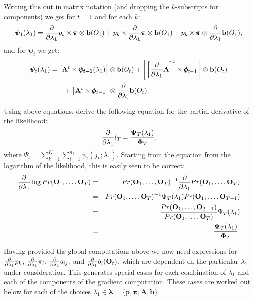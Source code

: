 \documentclass[a4paper,12pt,doc]{apaIngmar} %
\newcommand{\mat}{\mathbf}
\newcommand{\vc}{\mathbf}
\begin{document}
Writing this out in matrix notation (and dropping the $k$-subscripts 
for components) we get for $t=1$ and for each $k$:
\begin{eqnarray}
	\pmb{\psi}_{1}(\lambda_{1}) = \vc{\fpp} p_{k} \times \pmb{\pi} 
	\otimes \vc{b}(O_{1})+ p_{k} \times \vc{\fpp}\pmb{\pi} \otimes
	\vc{b}(O_{1}) + p_{k} \times \pmb{\pi} \otimes \fpp \vc{b}(O_{1}),
\end{eqnarray}
and for $\pmb{\psi}_{t}$ we get: 
\begin{equation}
	\begin{split} 
		\pmb{\psi}_{t}(\lambda_{1}) &= \left[ \mat{A}^{t} \times
		\pmb{\psi_{t-1}}(\lambda_{1}) \right ] \otimes \vc{b}(O_{t}) +
		\left [ \left[ \fpp \mat{A} \right ]^{t} \times
		\pmb{\phi}_{t-1} \right ] \otimes \vc{b}(O_{t}) \\
		& \qquad + \left [ \mat{A}^{t} \times \pmb{\phi}_{t-1} \right]
		\otimes \fpp \vc{b}(O_{t}).
	\end{split}
\end{equation}

Using above equations, \cite{Lystig2002} derive the following equation 
for the partial derivative of the likelihood:
\begin{equation}
	\frac{\partial} {\partial \lambda_{1}} l_{T}=
	\frac{\mathbf{\Psi}_{T}(\lambda_{1})}{\mathbf{\Phi}_{T}},
\end{equation}
where $\Psi_{t}=\sum_{k=1}^{K} \sum_{i=1}^{n_{k}} 
\psi_{t}(j_{k};\lambda_{1})$. 
Starting from the equation from the logarithm of the likelihood, this 
is easily seen to be correct: 
\begin{eqnarray}
	\fpp \log Pr(\vc{O}_{1}, \ldots, \vc{O}_{T}) &=& Pr(\vc{O}_{1},
	\ldots, \vc{O}_{T})^{-1} \fpp Pr(\vc{O}_{1}, \ldots, \vc{O}_{T})
	\\
	&=& Pr(\vc{O}_{1}, \ldots, \vc{O}_{T})^{-1} \Psi_{T}(\lambda_{1})
	Pr(\vc{O}_{1}, \ldots, \vc{O}_{T-1}) \\
	&=& \frac{Pr(\vc{O}_{1}, \ldots, \vc{O}_{T-1})}{Pr(\vc{O}_{1},
	\ldots, \vc{O}_{T})} \Psi_{T} (\lambda_{1}) \\
	&=&  \frac{\mathbf{\Psi}_{T}(\lambda_{1})}{\mathbf{\Phi}_{T}}.
\end{eqnarray}

Having provided the global computations above we now need expressions
for $\frac{\partial} {\partial \lambda_{1}} p_{k}$, $\frac{\partial} {\partial \lambda_{1}} \pi_{i}$, $\frac{\partial} {\partial \lambda_{1}} a_{ij}$, and $\fpp
b_{i}(\vc{O}_{t})$, which are dependent on the particular
$\lambda_{1}$ under consideration.  This generates special cases for
each combination of $\lambda_{1}$ and each of the components of the
gradient computation.  These cases are worked out below for each of
the choices $\lambda_{1} \in \pmb{\lambda}=\{
\vc{p},\pmb{\pi},\mat{A},\vc{b} \}$.
\end{document}
